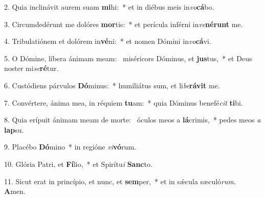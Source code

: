 2. Quia inclinávit aurem suam \textbf{mi}hi:~*  et in diébus meis in\textit{vo}\textbf{cá}bo.\

3. Circumdedérunt me dolóres \textbf{mor}tis:~*  et perícula inférni in\textit{ve}\textbf{né}\textbf{runt} me.\

4. Tribulatiónem et dolórem in\textbf{vé}ni:~*  et nomen Dómini in\textit{vo}\textbf{cá}vi.\

5. O Dómine, líbera ánimam meam: \dag\  miséricors Dóminus, et \textbf{jus}tus,~*  et Deus noster mi\textit{se}\textbf{ré}tur.\

6. Custódiens párvulos \textbf{Dó}minus:~*  humiliátus sum, et li\textit{be}\textbf{rá}\textbf{vit} me.\

7. Convértere, ánima mea, in réquiem \textbf{tu}am:~*  quia Dóminus benefé\textit{cit} \textbf{ti}bi.\

8. Quia erípuit ánimam meam de morte: \dag\  óculos meos a \textbf{lá}crimis,~*  pedes meos \textit{a} \textbf{lap}su.\

9. Placébo \textbf{Dó}mino~*  in regióne \textit{vi}\textbf{vó}rum.\

10. Glória Patri, et \textbf{Fí}lio,~*  et Spirítu\textit{i} \textbf{Sanc}to.\

11. Sicut erat in princípio, et nunc, et \textbf{sem}per,~*  et in sǽcula sæculó\textit{rum}. \textbf{A}men.\

